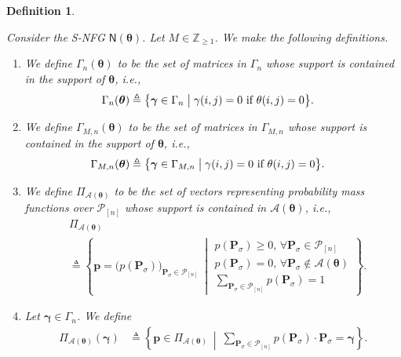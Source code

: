 \documentclass[journal,lettersize,twocolumn]{IEEEtran} %
\newtheorem{definition}[theorem]{Definition}
\newcommand{\vect}[1]{ \bm{#1} }
\newcommand{\set}[1]{\mathcal{#1}}
\newcommand{\vgam}{ \vect{\gamma} }
\newcommand{\sfN}{ \mathsf{N} }
\newcommand{\sZpp}{\mathbb{Z}_{\geq 1}}
\newcommand{\matr}[1]{ \bm{#1} }
\newcommand{\defeq}{ \triangleq }
\newcommand{\setP}{\set{P}}
\newcommand{\mtheta}{\matr{\theta}}
\newcommand{\vtheta}{\matr{\theta}}
\newcommand{\mP}{\matr{P}}
\newcommand{\setA}{ \set{A} }
\newcommand{\vp}{\bm{p} }
\newcommand{\PiA}[1]{ \Pi_{\setA(#1)} }
\newcommand{\Gamnthe}{ \Gamma_{n}(\vtheta) }
\newcommand{\GamMnthe}{ \Gamma_{M,n}(\vtheta) }
\newcommand{\ie}{\textit{i.e.}}
\begin{document}
%

\begin{definition}
  \label{sec:1:def:10}

  Consider the S-NFG $ \sfN(\mtheta) $. Let $M \in \sZpp $.  We make the
  following definitions.
  \begin{enumerate}

  \item We define $\Gamnthe$ to be the set of matrices in $\Gamma_{n}$ whose
    support is contained in the support of $\mtheta$, \ie,
    \begin{align*}
      \Gamnthe
        &\defeq 
           \bigl\{ 
             \vgam \in \Gamma_{n}
           \bigm|
             \gamma(i,j) = 0 \text{ if } \theta(i,j) = 0
           \bigr\}.
    \end{align*}

  \item We define $\GamMnthe$ to be the set of matrices in $\Gamma_{M,n}$
    whose support is contained in the support of $\mtheta$, \ie,
     \begin{align*}
       \GamMnthe
         &\defeq 
            \bigl\{ 
              \vgam \in \Gamma_{M,n}
            \bigm|
              \gamma(i,j) = 0 \text{ if } \theta(i,j) = 0
            \bigr\}.
     \end{align*}

  \item We define $\PiA{\mtheta}$ to be the set of vectors representing
    probability mass functions over $\setP_{[n]}$ whose support is contained
    in $\setA(\mtheta)$, \ie,
    \begin{align*}
    &
    \PiA{\mtheta} \\
      &\defeq
         \left\{ 
           \vp = \bigl( p(\mP_{\sigma}) \bigr)_{\mP_{\sigma} \in \setP_{[n]}}
        \ \middle| \!
          \begin{array}{c}
            p(\mP_{\sigma}) \geq 0, \, 
              \forall \mP_{\sigma} \in \setP_{[n]} \\
            p(\mP_{\sigma}) = 0, \, 
              \forall \mP_{\sigma} 
                        \notin \set{A}(\mtheta) \\
            \sum\limits_{\mP_{\sigma} \in \setP_{[n]}} p(\mP_{\sigma}) = 1
          \end{array} \!
        \right\}.
    \end{align*}

  \item Let $\vgam \in \Gamma_n$. We define
    \begin{align*}
      \PiA{\mtheta}( \vgam )
        &\defeq 
          \left\{ 
              \vp 
              \in \PiA{\mtheta}
          \ \middle| \ 
              \sum_{\mP_{\sigma} \in \setP_{[n]}}
                p(\mP_{\sigma}) \cdot \mP_{\sigma} = \vgam
          \right\}.
    \end{align*}


\end{enumerate}
\end{definition}
\end{document}
